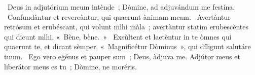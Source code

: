 ~Deus in adjutórium meum intènde~; Dòmine, ad adjuvándum me festína. 
~Confundàntur et revereàntur, qui quaerunt ànimam meam. 
~Avertàntur retrósum et erubéscant, qui volunt mìhi màla~; avertàntur statim erubescèntes qui dicunt mìhi, «~Bène, bène.~» 
~Exsùltent et laetèntur in te òmnes qui quaerunt te, et dicant sèmper, «~Magnificétur Dòminus~», qui díligunt salutáre tuum. 
~Ego vero eġénus et pauper sum~; Deus, àdjuva me. Adjútor meus et liberátor meus es tu~; Dòmine, ne moréris. 
